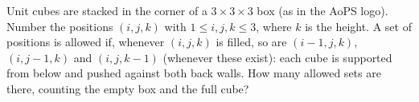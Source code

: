 Unit cubes are stacked in the corner of a $3\times3\times3$ box (as in the AoPS logo). Number the positions $(i,j,k)$ with $1\le i,j,k\le3$, where $k$ is the height. A set of positions is allowed if, whenever $(i,j,k)$ is filled, so are $(i-1,j,k)$, $(i,j-1,k)$ and $(i,j,k-1)$ (whenever these exist): each cube is supported from below and pushed against both back walls. How many allowed sets are there, counting the empty box and the full cube?
